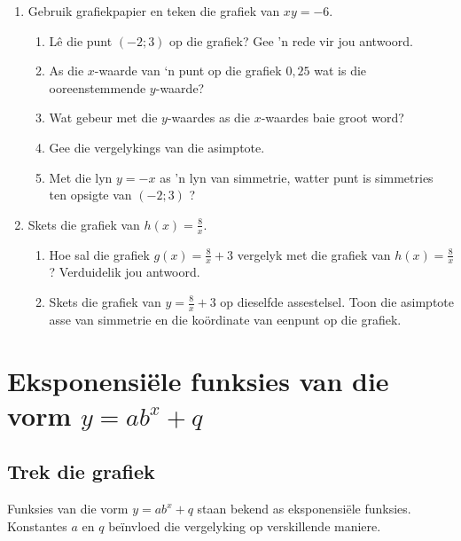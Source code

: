 \begin{exercises}{}
{
\begin{enumerate}[noitemsep, label=\textbf{\arabic*}. ] 
\item Gebruik grafiekpapier en teken die grafiek van  $xy=-6$.
    \begin{enumerate}[noitemsep, label=\textbf{(\alph*)} ] 
    \item Lê die punt $(-2; 3)$  op die grafiek? Gee ’n rede vir jou antwoord.
    \item As die $x$-waarde van ‘n punt op die grafiek $0,25$ wat is die ooreenstemmende $y$-waarde?
    \item Wat gebeur met die $y$-waardes as die $x$-waardes baie groot word?
    \item Gee die vergelykings van die asimptote.
    \item Met die lyn $y=-x$ as ’n lyn van simmetrie, watter punt is simmetries ten opsigte van $(-2; 3)$ ?
    \end{enumerate}
\item Skets die grafiek van  $h(x)=\frac{8}{x}$.
    \begin{enumerate}[noitemsep, label=\textbf{(\alph*)} ] 
    \item Hoe sal die grafiek $g(x)=\frac{8}{x}+3$ vergelyk met die grafiek van $h(x)=\frac{8}{x}$? Verduidelik jou antwoord.
    \item Skets die grafiek van $y=\frac{8}{x}+3$ op dieselfde assestelsel. Toon die asimptote asse van simmetrie en die ko\"ordinate van eenpunt op die grafiek.
    \end{enumerate}

 \end{enumerate}
}
\end{exercises}

\section{Eksponensiële funksies van die vorm $y=ab^{x}+q$}

\subsection*{Trek die grafiek}         
Funksies van die vorm $y=ab^{x}+q$ staan bekend as eksponensiële funksies. Konstantes $a$ en $q$ be\"invloed die vergelyking op verskillende maniere.
\par
{}

